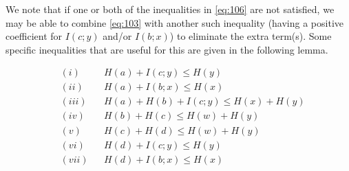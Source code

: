 \documentclass[10pt,journal]{IEEEtran}
\begin{document}
We note that if one or both of the inequalities in
\eqref{eq:106} are not satisfied,
we may be able to combine \eqref{eq:103}
with another such inequality
(having a positive coefficient for $I(c;y)$ and/or $I(b;x)$)
to eliminate the extra term(s).
Some specific inequalities that are useful for this are given in the following lemma.

%
\begin{lemma}
%
\begin{align*}
&(i)   &&H(a) + I(c;y)        \le H(y)\\
&(ii)  &&H(a) + I(b;x)        \le H(x)\\
&(iii) &&H(a) + H(b) + I(c;y) \le H(x) + H(y)\\
&(iv)  &&H(b) + H(c)          \le H(w) + H(y)\\
&(v)   &&H(c) + H(d)          \le H(w) + H(y)\\
&(vi)  &&H(d) + I(c;y)        \le H(y)\\
&(vii) &&H(d) + I(b;x)        \le H(x)
\end{align*}
%
\end{lemma}
\end{document}
